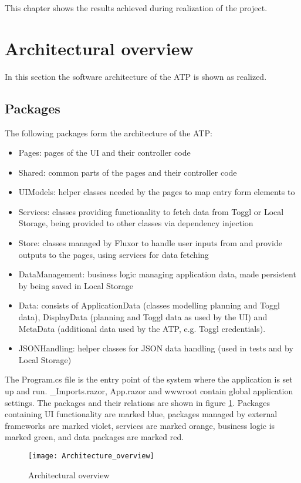 
This chapter shows the results achieved during realization of the project.

\section{Architectural overview} \label{Architecture}
In this section the software architecture of the ATP is shown as realized.

\subsection{Packages}
The following packages form the architecture of the ATP:
\begin{itemize}
	\item Pages: pages of the UI and their controller code
	\item Shared: common parts of the pages and their controller code
	\item UIModels: helper classes needed by the pages to map entry form elements to
	\item Services: classes providing functionality to fetch data from Toggl or Local Storage, being provided to other classes via dependency injection
	\item Store: classes managed by Fluxor to handle user inputs from and provide outputs to the pages, using services for data fetching
	\item DataManagement: business logic managing application data, made persistent by being saved in Local Storage
	\item Data: consists of ApplicationData (classes modelling planning and Toggl data), DisplayData (planning and Toggl data as used by the UI) and MetaData (additional data used by the ATP, e.g. Toggl credentials).
	\item JSONHandling: helper classes for JSON data handling (used in tests and by Local Storage)
\end{itemize}
The Program.cs file is the entry point of the system where the application is set up and run. \_Imports.razor, App.razor and wwwroot contain global application settings. The packages and their relations are shown in figure \ref{architecture_overview}. Packages containing UI functionality are marked blue, packages managed by external frameworks are marked violet, services are marked orange, business logic is marked green, and data packages are marked red.
\begin{figure}[H]
	\centering
	\texttt{[image: Architecture\_overview]}
	\caption{Architectural overview}
	\label{architecture_overview}
\end{figure}

